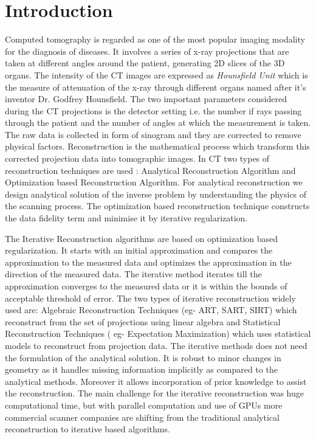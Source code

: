 \documentclass[12pt]{article}
\newcommand{\noin}{\noindent}
\begin{document}
	\section{Introduction}
	\noin Computed tomography is regarded as one of the most popular imaging modality for the diagnosis of diseases. It involves a series of x-ray projections that are taken at different angles around the patient, generating 2D slices of the 3D organs. The intensity  of the CT images are expressed as \emph{Hounsfield Unit} which is the measure of attenuation of the x-ray through different organs named after it's inventor Dr. Godfrey Hounsfield. The two important parameters considered during the CT projections is the detector setting i.e. the number if rays passing through the patient and the number of angles at which the measurement is taken. The raw data is collected in form of sinogram and they are corrected to remove physical factors. Reconstruction is the mathematical process which transform this corrected projection data into tomographic images. In CT two types of reconstruction techniques are used : Analytical Reconstruction Algorithm and Optimization based Reconstruction Algorithm. For analytical reconstruction we design analytical solution of the inverse problem by understanding the physics of the scanning process. The optimization based reconstruction technique constructs the data fidelity term and minimise it by iterative regularization. 
	
	\vspace{0.2in}
	
	\noin The Iterative Reconstruction algorithms are based on optimization based regularization. It starts with an initial approximation and compares the approximation to the measured data and optimizes the approximation in the direction of the measured data. The iterative method iterates till the approximation converges to the measured data or it is within the bounds of acceptable threshold of error. The two types of iterative reconstruction widely used are: Algebraic Reconstruction Techniques (eg- ART, SART, SIRT) which reconstruct from the set of projections using linear algebra and Statistical Reconstruction Techniques ( eg- Expectation Maximization) which uses statistical models to reconstruct from projection data. The iterative methods does not need the formulation of the analytical solution. It is robust to minor changes in geometry as it handles missing information implicitly as compared to the analytical methods. Moreover it allows incorporation of prior knowledge to assist the reconstruction. The main challenge for the iterative reconstruction was huge computational time, but with parallel computation and use of GPUs more commercial scanner companies are shifting from the traditional analytical reconstruction to iterative based algorithms.
	
\end{document}

